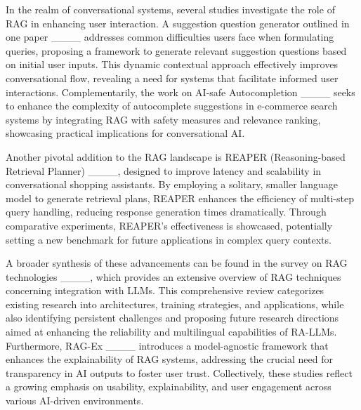 In the realm of conversational systems, several studies investigate the role of RAG in enhancing user interaction. A suggestion question generator outlined in one paper ____ addresses common difficulties users face when formulating queries, proposing a framework to generate relevant suggestion questions based on initial user inputs. This dynamic contextual approach effectively improves conversational flow, revealing a need for systems that facilitate informed user interactions. Complementarily, the work on AI-safe Autocompletion ____ seeks to enhance the complexity of autocomplete suggestions in e-commerce search systems by integrating RAG with safety measures and relevance ranking, showcasing practical implications for conversational AI.

Another pivotal addition to the RAG landscape is REAPER (Reasoning-based Retrieval Planner) ____, designed to improve latency and scalability in conversational shopping assistants. By employing a solitary, smaller language model to generate retrieval plans, REAPER enhances the efficiency of multi-step query handling, reducing response generation times dramatically. Through comparative experiments, REAPER's effectiveness is showcased, potentially setting a new benchmark for future applications in complex query contexts.

A broader synthesis of these advancements can be found in the survey on RAG technologies ____, which provides an extensive overview of RAG techniques concerning integration with LLMs. This comprehensive review categorizes existing research into architectures, training strategies, and applications, while also identifying persistent challenges and proposing future research directions aimed at enhancing the reliability and multilingual capabilities of RA-LLMs. Furthermore, RAG-Ex ____ introduces a model-agnostic framework that enhances the explainability of RAG systems, addressing the crucial need for transparency in AI outputs to foster user trust. Collectively, these studies reflect a growing emphasis on usability, explainability, and user engagement across various AI-driven environments.